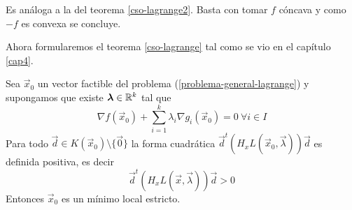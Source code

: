 \begin{demostracion}
Es an\'aloga a la del teorema \ref{cso-lagrange2}. Basta con tomar $f$ c\'oncava y como $-f$ es convexa se concluye.
\end{demostracion}

Ahora formularemos el teorema \ref{cso-lagrange} tal como se vio en el cap\'itulo \ref{cap4}.

\begin{teorema}\label{cso-lagrange3}
Sea $\vec{x}_0$ un vector factible del problema (\ref{problema-general-lagrange}) y supongamos que existe $\boldsymbol{\lambda} \in \mathbb{R}^k$ tal que
$$\nabla f(\vec{x}_0) + \sum_{i=1}^k \lambda_i \nabla g_i(\vec{x}_0)=0 \: \forall i\in I$$
Para todo $\vec{d} \in K(\vec{x}_0)\setminus \{\vec{0}\}$ la forma cuadr\'atica $\vec{d}^t (H_x L(\vec{x}_0,\vec{\lambda})) \vec{d}$ es definida positiva, es decir
$$\vec{d}^t (H_x L(\vec{x},\vec{\lambda})) \vec{d} > 0$$
Entonces $\vec{x}_0$ es un m\'inimo local estricto.
\end{teorema}

